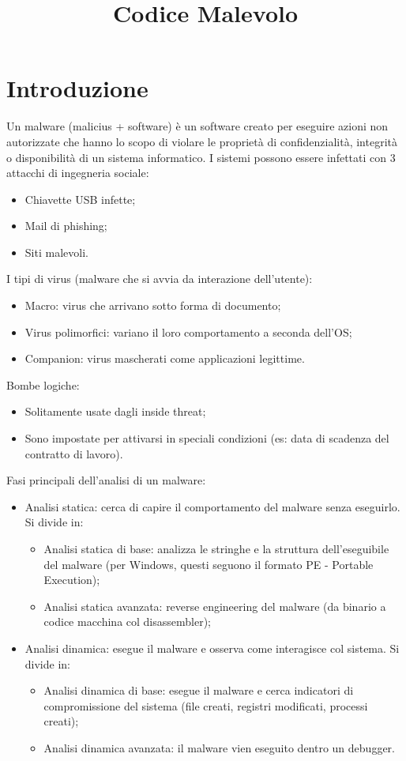 \documentclass[a4paper]{book}
\title{Codice Malevolo}
\begin{document}
\maketitle

\chapter{Introduzione}
Un malware (malicius + software) è un software creato per eseguire azioni non autorizzate che hanno lo scopo di violare le proprietà di confidenzialità, integrità o disponibilità di un sistema informatico. I sistemi possono essere infettati con 3 attacchi di ingegneria sociale:
\begin{itemize}
    \item Chiavette USB infette;
    \item Mail di phishing;
    \item Siti malevoli.
\end{itemize}

I tipi di virus (malware che si avvia da interazione dell'utente):
\begin{itemize}
    \item Macro: virus che arrivano sotto forma di documento;
	\item Virus polimorfici: variano il loro comportamento a seconda dell'OS;
	\item Companion: virus mascherati come applicazioni legittime.
\end{itemize}

Bombe logiche:
\begin{itemize}
    \item Solitamente usate dagli inside threat;
	\item Sono impostate per attivarsi in speciali condizioni (es: data di scadenza del contratto di lavoro).
\end{itemize}

Fasi principali dell'analisi di un malware:
\begin{itemize}
    \item Analisi statica: cerca di capire il comportamento del malware senza eseguirlo. Si divide in:
		\begin{itemize}
		    \item Analisi statica di base: analizza le stringhe e la struttura dell'eseguibile del malware (per Windows, questi seguono il formato PE - Portable Execution);
		    \item Analisi statica avanzata: reverse engineering del malware (da binario a codice macchina col disassembler);
		\end{itemize}
	\item Analisi dinamica: esegue il malware e osserva come interagisce col sistema. Si divide in:
		\begin{itemize}
		    \item Analisi dinamica di base: esegue il malware e cerca indicatori di compromissione del sistema (file creati, registri modificati, processi creati);
		\item Analisi dinamica avanzata: il malware vien eseguito dentro un debugger.
		\end{itemize}
\end{itemize}
\end{document}
